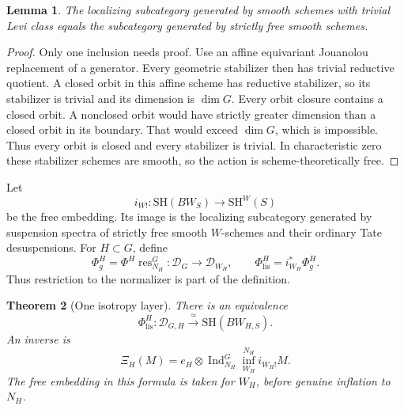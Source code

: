 \documentclass[11pt,reqno]{amsart}
\newtheorem{theorem}{Theorem}[section]
\newtheorem{lemma}[theorem]{Lemma}
\theoremstyle{definition}
\theoremstyle{remark}
\theoremstyle{plain}
\numberwithin{equation}{section}
\newcommand{\SH}{\mathrm{SH}}
\newcommand{\lis}{\mathrm{lis}}
\newcommand{\D}{\mathcal D}
\begin{document}
\begin{lemma}\label{lem:unipotent-free}
The localizing subcategory generated by smooth schemes with
trivial Levi class equals the subcategory generated by strictly
free smooth schemes.
\end{lemma}

\begin{proof}
Only one inclusion needs proof.
Use an affine equivariant Jouanolou replacement of a generator.
Every geometric stabilizer then has trivial reductive quotient.
A closed orbit in this affine scheme has reductive stabilizer,
so its stabilizer is trivial and its dimension is \(\dim G\).
Every orbit closure contains a closed orbit.
A nonclosed orbit would have strictly greater dimension than
a closed orbit in its boundary.
That would exceed \(\dim G\), which is impossible.
Thus every orbit is closed and every stabilizer is trivial.
In characteristic zero these stabilizer schemes are smooth,
so the action is scheme-theoretically free.
\end{proof}

Let
\[
 i_{W!}:\SH(BW_S)\longrightarrow\SH^W(S)
\]
be the free embedding.
Its image is the localizing subcategory generated by suspension
spectra of strictly free smooth \(W\)-schemes and their ordinary
Tate desuspensions.
For \(H\subset G\), define
\[
 \Phi_g^H=\Phi^{H}\operatorname{res}_{N_H}^G:
 \D_G\longrightarrow\D_{W_H},
 \qquad
 \Phi_{\lis}^H=i_{W_H}^*\Phi_g^H.
\]
Thus restriction to the normalizer is part of the definition.

\begin{theorem}[One isotropy layer]\label{thm:isotropy-layer}
There is an equivalence
\[
 \Phi_{\lis}^H:\D_{G,H}
   \xrightarrow{\ \simeq\ }\SH(BW_{H,S}).
\]
An inverse is
\begin{equation}\label{eq:layer-inverse}
 \Xi_H(M)=
 e_H\otimes
 \operatorname{Ind}_{N_H}^G
 \operatorname{inf}_{W_H}^{N_H} i_{W_H!}M.
\end{equation}
The free embedding in this formula is taken for \(W_H\), before
genuine inflation to \(N_H\).
\end{theorem}
\end{document}
